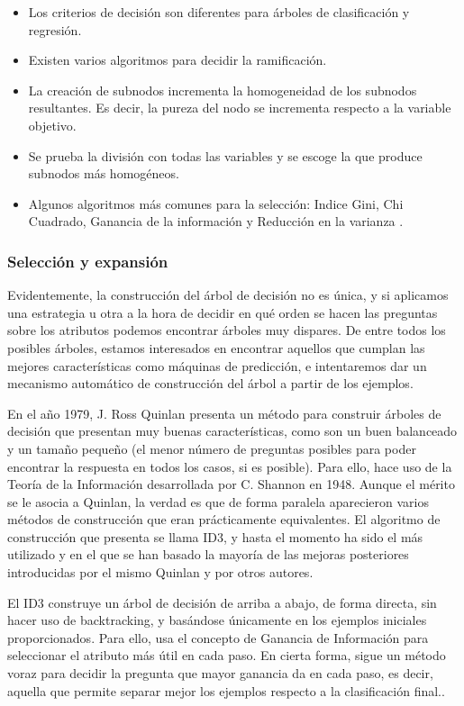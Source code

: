 \documentclass[10pt]{article}
\begin{document}
\begin{itemize}
    \item Los criterios de decisión son diferentes para árboles de clasificación y regresión.
    \item Existen varios algoritmos para decidir la ramificación.
    \item La creación de subnodos incrementa la homogeneidad de los subnodos resultantes. Es decir, la pureza del nodo se incrementa respecto a la variable objetivo.
    \item  Se prueba la división con todas las variables y se escoge la que produce subnodos más homogéneos.
    \item Algunos algoritmos más comunes para la selección: Indice Gini, Chi Cuadrado, Ganancia de la información y Reducción en la varianza \cite{IEEEreferencias:Ref44}.

\end{itemize}

\subsubsection{Selección y expansión}

Evidentemente, la construcción del árbol de decisión no es única, y si aplicamos una estrategia u otra a la hora de decidir en qué orden se hacen las preguntas sobre los atributos podemos encontrar árboles muy dispares. De entre todos los posibles árboles, estamos interesados en encontrar aquellos que cumplan las mejores características como máquinas de predicción, e intentaremos dar un mecanismo automático de construcción del árbol a partir de los ejemplos\cite{IEEEreferencias:Ref45}.

En el año 1979, J. Ross Quinlan presenta un método para construir árboles de decisión que presentan muy buenas características, como son un buen balanceado y un tamaño pequeño (el menor número de preguntas posibles para poder encontrar la respuesta en todos los casos, si es posible). Para ello, hace uso de la Teoría de la Información desarrollada por C. Shannon en 1948. Aunque el mérito se le asocia a Quinlan, la verdad es que de forma paralela aparecieron varios métodos de construcción que eran prácticamente equivalentes. El algoritmo de construcción que presenta se llama ID3, y hasta el momento ha sido el más utilizado y en el que se han basado la mayoría de las mejoras posteriores introducidas por el mismo Quinlan y por otros autores\cite{IEEEreferencias:Ref45}.

El ID3 construye un árbol de decisión de arriba a abajo, de forma directa, sin hacer uso de backtracking, y basándose únicamente en los ejemplos iniciales proporcionados. Para ello, usa el concepto de Ganancia de Información para seleccionar el atributo más útil en cada paso. En cierta forma, sigue un método voraz para decidir la pregunta que mayor ganancia da en cada paso, es decir, aquella que permite separar mejor los ejemplos respecto a la clasificación final\cite{IEEEreferencias:Ref45}..
\end{document}
